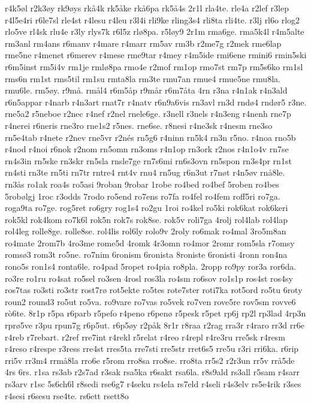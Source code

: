 {r4k5øl
r2k3øy
rk9øys
rkå4k
rk5åke
rkå6pa
rk5å4s
2r1l
rla4te.
rle4a
r2lef
r3lep
r4l5e4ri
r6le7sl
rle4st
r4lesu
r4leu
r3l4i
rli9ke
rling3s4
rli8ta
rli4te.
r3lj
rl6o
rlog2
rlo5ve
rl4sk
rlu4e
r3ly
rlys7k
r6l5z
rlø8pa.
r5løy9
2r1m
rma6ge.
rma5k4l
r4m5alte
rm3anl
rm4ans
r6manv
r4mare
r4marr
rm5av
rm3b
r2me7g
r2mek
rme6lap
rme5ne
r4menet
r6merev
r4mese
rme9tar
r4mey
r4m5ide
rmi6ene
rmini6
rmin5ski
r6m5inst
rm5i4v
rm1je
rmlø8pa
rmo4e
r2mof
rm1op
rmo7st
rm7p
rm5s6ko
rm1sl
rms6n
rm1st
rms5til
rm1su
rmta8la
rm3te
rmu7an
rmue4
rmue5ne
rmu8la.
rmu6le.
rm5øy.
r9må.
rmål4
r6m5åp
r9mår
r6m7åta
4rn
r3na
r4n1ak
r4n3ald
r6n5appar
r4narb
r4n3art
rnat7r
r4natv
r6n9a6vis
rn3avl
rn3d
rndø4
rndør5
r3ne.
rne5a2
r5neboe
r2nec
r4nef
r2nel
rnele6ge.
r3nell
r3nels
r4n3eng
r4nenh
rne7p
r4nerei
r6neris
rne3ro
rne1s2
r5nes.
rne6se.
r8nesi
r4ne3sk
r4nesm
rne3so
rn5e4tab
r4nete
r2nev
rne5vr
r2nés
rn5g6
r4ninn
rn5k4
rn3n
r5no.
r4noa
rno5b
r4nod
r4noi
r6nok
r2nom
rn5omn
rn3oms
r4n1op
rn3ork
r2nos
r4n1o4v
rn7se
rn4s3in
rn5ske
rn3skr
rn5sla
rnsle7ge
rn7s6mi
rn6s3ovn
rn5spon
rn3s4pr
rn1st
rn4sti
rn3te
rn5ti
rn7tr
rntre4
rnt4v
rnu4
rn5ug
r6n3ut
r7nøt
r4n5øv
rnå8le.
rn3ås
ro1ak
roa4s
ro5asi
9roban
9robar
1robe
ro4bed
ro4bef
5roben
ro4bes
5robølgj
1roc
r3odds
7rodo
ro5end
ro7ens
ro7fa
ro4fel
ro4fem
roff5ri
ro7ga.
roga9ta
ro7ge.
rog5ret
ro6gry
rog1s4
ro2gu
1roi
ro4kel
ro5ki
rok6kat
rok6keri
rok5kl
rok4kom
ro7k6l
rok5n
rok7s
rok8se.
rok5v
roli7ga
4rolj
rol4lab
rol4lap
rol4leg
rolle8ge.
rolle8se.
rol4lis
rol6ly
rolo9v
2roly
ro6mak
ro4mal
3ro5m8an
ro4mate
2rom7b
4ro3me
rome5d
4romk
4r3omn
ro4mor
2romr
rom5sla
r7omsy
romsø3
rom3t
ro5ne.
ro7nim
6ronism
6ronista
8roniste
6ronisti
4ronn
ron4na
rono5s
ron1s4
ronta6le.
ro4pad
5ropet
ro4pia
ro8pla.
2ropp
ro9py
ror3a
ror6da.
ro3re
ro1ru
ro4sat
ro5sel
ro3sen
4rosl
ros3la
ro4sm
ro6sov
ro1s1p
ros4st
ros4sy
ros7tas
ro3sti
ro3str
rost7rø
rot5ekte
ro5tes
rote7ster
roti7ka
rot5ord
ro5tu
6roty
roun2
round3
ro5ut
ro5va.
ro9vare
ro7vas
ro5vek
ro7ven
rove5re
rov5sm
rovve6
rò6te.
8r1p
r5pa
r6parb
r5pefo
r4peno
r6penø
r5pesk
r5pet
rp6j
rp2l
rp3lad
4rp3n
rprø5ve
r3pu
rpun7g
r6p5ut.
r6p5øy
r2påk
8r1r
r8raa
r2rag
rra3r
r4raro
rr3d
rr6e
r4reb
r7rebart.
r2ref
rre7int
r4rekl
r5relat
r4reo
r4repl
r4re3ru
rre5sk
r4resm
r4reso
r4respe
r3ress
rre4st
rres5ta
rre7sti
rre5str
rret6s5
rre5u
r3ri
rri6ka.
r6rip
rri5v
rr3m4
rrmå8la
rro6e
r5rom
rro8sa
rro8se.
rro8ta
rr5s2
r2r3un
rr5v
rrå5de
4rs
6rs.
r1sa
rs3ab
r2s7ad
r3sak
rsa5ka
r6sakt
rsa6la.
r8s9ald
rs3all
r5sam
r4sarr
rs3arv
r1sc
5s6ch6l
r8sedi
rse6g7
r4seku
rs4ela
rs7eld
r4seli
r4s3elv
rs5e4rik
r3ses
r4sesi
r6sesu
rse4te.
rs6ett
rsett8o
}
